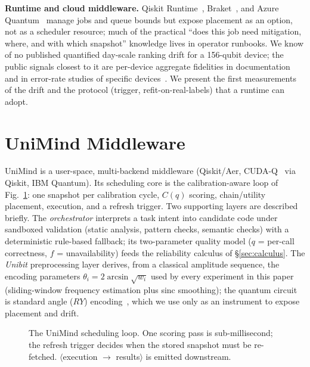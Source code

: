 \documentclass[journal,10pt,twocolumn]{IEEEtran}
\begin{document}
\textbf{Runtime and cloud middleware.} Qiskit Runtime~\cite{ibmrtime}, Braket~\cite{braket}, and Azure
Quantum~\cite{azureq} manage jobs and queue bounds but expose placement as an option, not as a scheduler resource;
much of the practical ``does this job need mitigation, where, and with which snapshot'' knowledge lives in operator
runbooks. We know of no published quantified day-scale ranking drift for a 156-qubit device; the public signals
closest to it are per-device aggregate fidelities in documentation~\cite{ibmcalib} and in error-rate studies of
specific devices~\cite{kim2023utility}. We present the first measurements of the drift and the protocol (trigger,
refit-on-real-labels) that a runtime can adopt.

\section{UniMind Middleware}
\label{sec:architecture}
UniMind is a user-space, multi-backend middleware (Qiskit/Aer, CUDA-Q~\cite{cuquantum} via Qiskit, IBM Quantum).
Its scheduling core is the calibration-aware loop of Fig.~\ref{fig:loop}: one snapshot per calibration cycle,
$C(q)$ scoring, chain/utility placement, execution, and a refresh trigger. Two supporting layers are described
briefly. The \emph{orchestrator} interprets a task intent into candidate code under sandboxed validation (static
analysis, pattern checks, semantic checks) with a deterministic rule-based fallback; its two-parameter quality
model ($q$ = per-call correctness, $f$ = unavailability) feeds the reliability calculus of \S\ref{sec:calculus}.
The \emph{Unibit} preprocessing layer derives, from a classical amplitude sequence, the encoding parameters
$\theta_i=2\arcsin\sqrt{w_i}$ used by every experiment in this paper (sliding-window frequency estimation plus
sinc smoothing); the quantum circuit is standard angle ($RY$) encoding~\cite{schuld2018,hhavlicek2019}, which we
use only as an instrument to expose placement and drift.

\begin{figure}[t]
\centering
{}%
\caption{The UniMind scheduling loop. One scoring pass is sub-millisecond; the refresh trigger decides when the
stored snapshot must be re-fetched. $\langle$execution $\to$ results$\rangle$ is emitted downstream.}
\label{fig:loop}
\end{figure}
\end{document}
